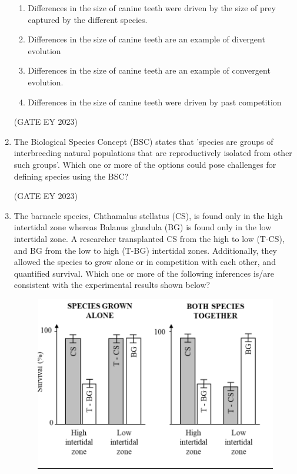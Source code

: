 \documentclass[journal,12pt,onecolumn]{IEEEtran}
\theoremstyle{remark}
\begin{document}
\begin{enumerate}
\begin{enumerate}
\item Differences in the size of canine teeth were driven by the size of prey captured by
the different species.
\item Differences in the size of canine teeth are an example of divergent evolution
\item Differences in the size of canine teeth are an example of convergent evolution.

\item Differences in the size of canine teeth were driven by past competition


\end{enumerate}
\hfill{(GATE EY 2023)}



 \item The Biological Species Concept (BSC) states that 'species are groups of
interbreeding natural populations that are reproductively isolated from other such
groups'. Which one or more of the options could pose challenges for defining
species using the BSC?
\begin{enumerate}
\end{enumerate}


\hfill{(GATE EY 2023)}


 \item The barnacle species, Chthamalus stellatus (CS), is found only in the high
intertidal zone whereas Balanus glandula (BG) is found only in the low intertidal
zone. A researcher transplanted CS from the high to low (T-CS), and BG from the
low to high (T-BG) intertidal zones. Additionally, they allowed the species to grow
alone or in competition with each other, and quantified survival.
Which one or more of the following inferences is/are consistent with the
experimental results shown below?

\begin{figure}[H]
    \centering
    \includegraphics[]{figs/Q.56.png}
    \caption{}
    \label{fig:10}
\end{figure}


\end{enumerate}
\end{document}
